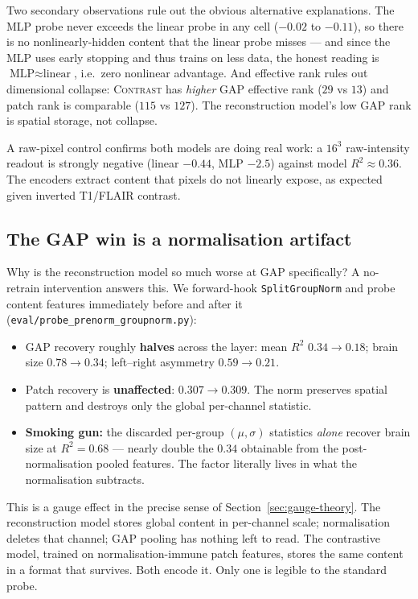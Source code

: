 \documentclass[11pt]{article}
\begin{document}
Two secondary observations rule out the obvious alternative explanations. The
MLP probe never exceeds the linear probe in any cell ($-0.02$ to $-0.11$), so
there is no nonlinearly-hidden content that the linear probe misses --- and
since the MLP uses early stopping and thus trains on less data, the honest
reading is $\text{MLP} \approx \text{linear}$, i.e.\ zero nonlinear advantage.
And effective rank rules out dimensional collapse: \textsc{Contrast} has
\emph{higher} GAP effective rank ($29$ vs $13$) and patch rank is comparable
($115$ vs $127$). The reconstruction model's low GAP rank is spatial storage,
not collapse.

A raw-pixel control confirms both models are doing real work: a $16^3$
raw-intensity readout is strongly negative (linear $-0.44$, MLP $-2.5$) against
model $R^2 \approx 0.36$. The encoders extract content that pixels do not
linearly expose, as expected given inverted T1/FLAIR contrast.

\subsection{The GAP win is a normalisation artifact}
\label{sec:gauge}

Why is the reconstruction model so much worse at GAP specifically? A no-retrain
intervention answers this. We forward-hook \texttt{SplitGroupNorm} and probe
content features immediately before and after it
(\texttt{eval/probe\_prenorm\_groupnorm.py}):

\begin{itemize}
\item GAP recovery roughly \textbf{halves} across the layer: mean $R^2$
$0.34 \to 0.18$; brain size $0.78 \to 0.34$; left--right asymmetry
$0.59 \to 0.21$.
\item Patch recovery is \textbf{unaffected}: $0.307 \to 0.309$. The norm
preserves spatial pattern and destroys only the global per-channel statistic.
\item \textbf{Smoking gun:} the discarded per-group $(\mu,\sigma)$ statistics
\emph{alone} recover brain size at $R^2 = 0.68$ --- nearly double the $0.34$
obtainable from the post-normalisation pooled features. The factor literally
lives in what the normalisation subtracts.
\end{itemize}

This is a gauge effect in the precise sense of
Section~\ref{sec:gauge-theory}. The reconstruction model stores global content
in per-channel scale; normalisation deletes that channel; GAP pooling has
nothing left to read. The contrastive model, trained on normalisation-immune
patch features, stores the same content in a format that survives. Both encode
it. Only one is legible to the standard probe.
\end{document}
